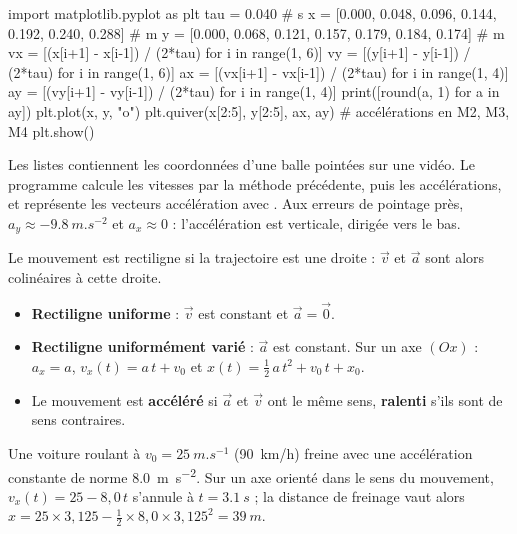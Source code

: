 \begin{python}
import matplotlib.pyplot as plt
tau = 0.040                                            # s
x = [0.000, 0.048, 0.096, 0.144, 0.192, 0.240, 0.288]  # m
y = [0.000, 0.068, 0.121, 0.157, 0.179, 0.184, 0.174]  # m
vx = [(x[i+1] - x[i-1]) / (2*tau) for i in range(1, 6)]
vy = [(y[i+1] - y[i-1]) / (2*tau) for i in range(1, 6)]
ax = [(vx[i+1] - vx[i-1]) / (2*tau) for i in range(1, 4)]
ay = [(vy[i+1] - vy[i-1]) / (2*tau) for i in range(1, 4)]
print([round(a, 1) for a in ay])
plt.plot(x, y, "o")
plt.quiver(x[2:5], y[2:5], ax, ay)       # accélérations en M2, M3, M4
plt.show()
\end{python}
\begin{console}
[-9.8, -9.7, -9.8]
\end{console}
\noindent{}Les listes contiennent les coordonnées d'une balle pointées sur une vidéo. Le
programme calcule les vitesses par la méthode précédente, puis les accélérations, et représente les vecteurs
accélération avec . Aux erreurs de pointage près, $a_y\approx\qty{-9,8}{m.s^{-2}}$ et $a_x\approx0$ :
l'accélération est verticale, dirigée vers le bas.
\begin{propriete}
Le mouvement est rectiligne si la trajectoire est une droite : $\vec{v}$ et $\vec{a}$ sont alors colinéaires à cette
droite.
\begin{itemize}[leftmargin=1.4em,itemsep=0.1em]
\item \textbf{Rectiligne uniforme} : $\vec{v}$ est constant et $\vec{a}=\vec{0}$.
\item \textbf{Rectiligne uniformément varié} : $\vec{a}$ est constant. Sur un axe $(Ox)$ :
$a_x=a$, $v_x(t)=a\,t+v_0$ et $x(t)=\frac12\,a\,t^2+v_0\,t+x_0$.
\item Le mouvement est \textbf{accéléré} si $\vec{a}$ et $\vec{v}$ ont le même sens, \textbf{ralenti} s'ils sont de sens
contraires.
\end{itemize}
\end{propriete}
\begin{exemple}
Une voiture roulant à $v_0=\qty{25}{m.s^{-1}}$ (90~km/h) freine avec une accélération constante de norme
\qty{8,0}{m.s^{-2}}. Sur un axe orienté dans le sens du mouvement, $v_x(t)=25-8{,}0\,t$ s'annule à $t=\qty{3,1}{s}$ ;
la distance de freinage vaut alors $x=25\times3{,}125-\frac12\times8{,}0\times3{,}125^2=\qty{39}{m}$.
\end{exemple}
